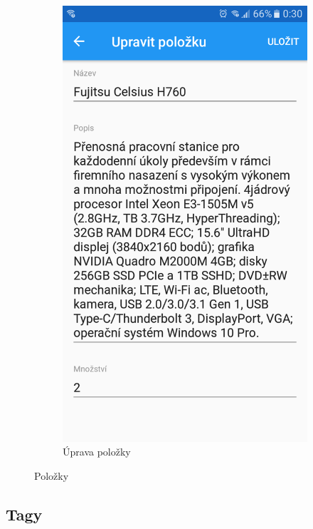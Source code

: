 \documentclass[czech,BP]{thesiskiv}
\begin{document}
\begin{figure}[H]
\begin{subfigure}[b]{0.3\textwidth}
	\includegraphics[width=\textwidth]{../images/client_android/Screenshot_20170612-003030.png}	
	\caption{Úprava položky}
	\label{fig:Screenshot_20170612-003030}
  \end{subfigure}
  \caption{Položky}
\end{figure}


\subsection{Tagy}
\end{document}
